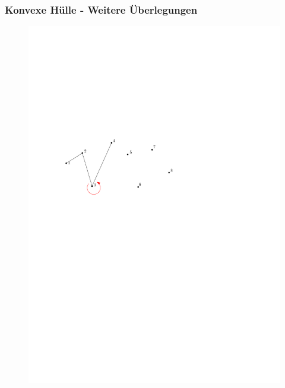 \begin{frame}
	\frametitle{{Konvexe Hülle - Weitere Überlegungen}}
\begin{figure}[htbp]
	\begin{center}
  	\includegraphics[width=.8\linewidth]{bilder/graham3}
	\end{center}
\end{figure}
\end{frame}


